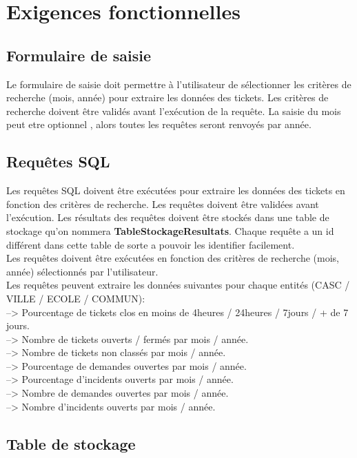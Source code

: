 \documentclass[a4paper,12pt]{article}
\begin{document}
\section{Exigences fonctionnelles}
\subsection{Formulaire de saisie}
Le formulaire de saisie doit permettre à l'utilisateur de sélectionner les critères de recherche (mois, année) pour extraire les données des tickets. Les critères de recherche doivent être validés avant l'exécution de la requête.
La saisie du mois peut etre optionnel , alors toutes les requêtes seront renvoyés par année.


\subsection{Requêtes SQL}
Les requêtes SQL doivent être exécutées pour extraire les données des tickets en fonction des critères de recherche. Les requêtes doivent être validées avant l'exécution. Les résultats des requêtes doivent être stockés dans une table de stockage qu'on nommera \textbf{TableStockageResultats}.
Chaque requête a un id différent dans cette table de sorte a pouvoir les identifier facilement. \\
Les requêtes doivent être exécutées en fonction des critères de recherche (mois, année) sélectionnés par l'utilisateur.\\
\newline
\newline
Les requêtes peuvent extraire les données suivantes pour chaque entités (CASC / VILLE / ECOLE / COMMUN): \\
\noindent --> Pourcentage de tickets clos en moins de 4heures / 24heures / 7jours / + de 7 jours. \\
\noindent --> Nombre de tickets ouverts / fermés par mois / année. \\
\noindent --> Nombre de tickets non classés par mois / année. \\
\noindent --> Pourcentage de demandes ouvertes par mois / année. \\
\noindent --> Pourcentage d'incidents ouverts par mois / année. \\
\noindent --> Nombre de demandes ouvertes par mois / année. \\
\noindent --> Nombre d'incidents ouverts par mois / année. \\


\subsection{Table de stockage}
\end{document}
